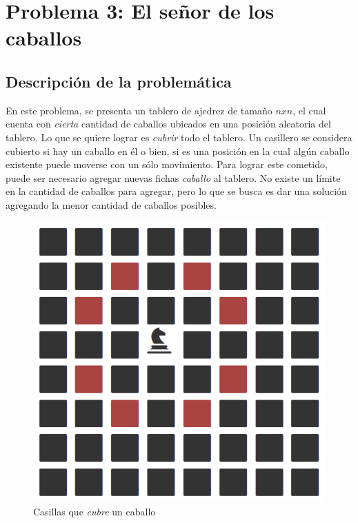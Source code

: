 \section{Problema 3: El se\~nor de los caballos}
\subsection{Descripci\'on de la problem\'atica}

En este problema, se presenta un tablero de ajedrez de tama\~no $nxn$, el cual cuenta con \emph{cierta} cantidad de caballos ubicados en una posici\'on aleatoria del tablero. Lo que se quiere lograr es \emph{cubrir} todo el tablero. Un casillero se considera cubierto si hay un caballo en \'el o bien, si es una posici\'on en la cual alg\'un caballo existente puede moverse con un s\'olo movimiento. Para lograr este cometido, puede ser necesario agregar nuevas fichas \emph{caballo} al tablero. No existe un l\'imite en la cantidad de caballos para agregar, pero lo que se busca es dar una soluci\'on agregando la menor cantidad de caballos posibles.\\

 \begin{figure}[h!]
   \begin{center}
 	\includegraphics[scale=0.4]{imagenes/ej3/unCaballo.png}
 	\caption{Casillas que \emph{cubre} un caballo}
   \end{center}
 \end{figure}

